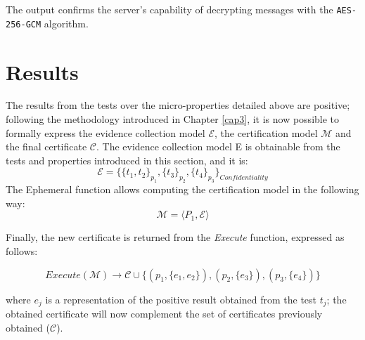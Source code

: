 The output confirms the server's capability of decrypting messages with the \texttt{AES-256-GCM} algorithm.





\section{Results}
The results from the tests over the micro-properties detailed above are positive; following the methodology introduced in Chapter \ref{cap3}, it is now possible to formally express the evidence collection model \(\mathcal{E}\), the certification model \(\mathcal{M}\) and the final certificate \(\mathcal{C}\). The evidence collection model E is obtainable from the tests and properties introduced in this section, and it is: 
\[ \mathcal{E} = \{ \{t_1, t_2\}_{p_1}, \{t_3\}_{p_2}, \{t_4\}_{p_3} \}_{Confidentiality}\]
The Ephemeral function allows computing the certification model in the following way:
\[\mathcal{M} = \langle P_1, \mathcal{E} \rangle\]

Finally, the new certificate is returned from the \textit{Execute} function, expressed as follows: 

\[Execute(\mathcal{M}) \rightarrow \mathcal{C} \cup \{(p_1, \{e_1, e_2\}), (p_2, \{e_3\}), (p_3, \{e_4\})\}\]

where \(e_j\) is a representation of the positive result obtained from the test \(t_j\); the obtained certificate will now complement the set of certificates previously obtained (\(\mathcal{C}\)).